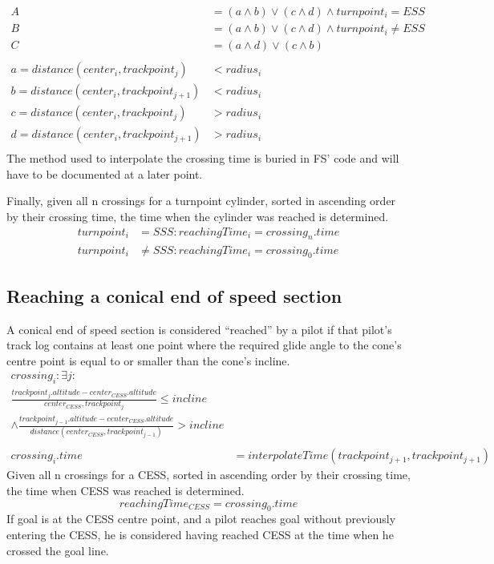 \documentclass{article}
\begin{document}
\begin{align*}
    A &= (a \land b) \lor (c \land d) \land turnpoint_i = ESS \\
    B &= (a \land b) \lor (c \land d) \land turnpoint_i \neq ESS \\
    C &= (a \land d) \lor (c \land b) \\
    \\
    a = distance(center_i, trackpoint_j) &< radius_i \\
    b = distance(center_i, trackpoint_{j+1}) &< radius_i \\
    c = distance(center_i, trackpoint_j) &> radius_i \\
    d = distance(center_i, trackpoint_{j+1}) &> radius_i \\
\end{align*}
The method used to interpolate the crossing time is buried in FS’ code and will
have to be documented at a later point.

Finally, given all n crossings for a turnpoint cylinder, sorted in ascending
order by their crossing time, the time when the cylinder was reached is
determined.
\begin{align*}
    turnpoint_i &= SSS : reachingTime_i = crossing_n . time \\
    turnpoint_i &\neq SSS : reachingTime_i = crossing_0 . time
\end{align*}
\subsection{Reaching a conical end of speed section}
\begin{pg}
A conical end of speed section is considered “reached” by a pilot if that
pilot’s track log contains at least one point where the required glide angle to
the cone’s centre point is equal to or smaller than the cone’s incline.
\begin{align*}
    crossing_i : \exists j : \\
    \frac{trackpoint_j . altitude - center_{CESS} . altitude}{center_{CESS}, trackpoint_{j}} \leq incline \\
    \land \frac{trackpoint_{j - 1} . altitude - center_{CESS} . altitude}{distance(center_{CESS}, trackpoint_{j - 1})} > incline \\
    \\
    crossing_i . time &= interpolateTime(trackpoint_{j + 1}, trackpoint_{j + 1})
\end{align*}
Given all n crossings for a CESS, sorted in ascending order by their crossing
time, the time when CESS was reached is determined.
\[ reachingTime_{CESS} = crossing_0 . time \]
If goal is at the CESS centre point, and a pilot reaches goal without
previously entering the CESS, he is considered having reached CESS at the time
when he crossed the goal line.
\end{pg}
\end{document}

